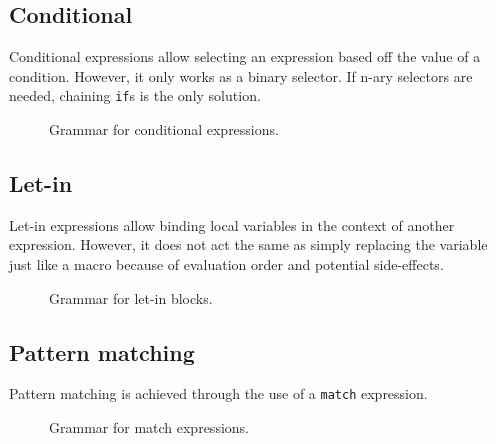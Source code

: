 \subsection{Conditional}\label{subsec:zilch-grammar-expressions-conditional}

Conditional expressions allow selecting an expression based off the value of a condition.
However, it only works as a binary selector.
If n-ary selectors are needed, chaining \texttt{if}s is the only solution.

\begin{figure}[H]
	\centering


	\caption{Grammar for conditional expressions.}
	\label{fig:zilch-gramma-expressions-conditional-grammar}
\end{figure}

\subsection{Let-in}\label{subsec:zilch-grammar-expressions-letin}

Let-in expressions allow binding local variables in the context of another expression.
However, it does not act the same as simply replacing the variable just like a macro because of evaluation order and potential side-effects.

\begin{figure}[H]
	\centering


	\caption{Grammar for let-in blocks.}
	\label{fig:zilch-grammar-expressions-letin-grammar}
\end{figure}

\subsection{Pattern matching}\label{subsec:zilch-grammar-expressions-match}

Pattern matching is achieved through the use of a \texttt{match} expression.

\begin{figure}[H]
	\centering


	\caption{Grammar for match expressions.}
	\label{fig:zilch-grammar-expressions-match-grammar}
\end{figure}

